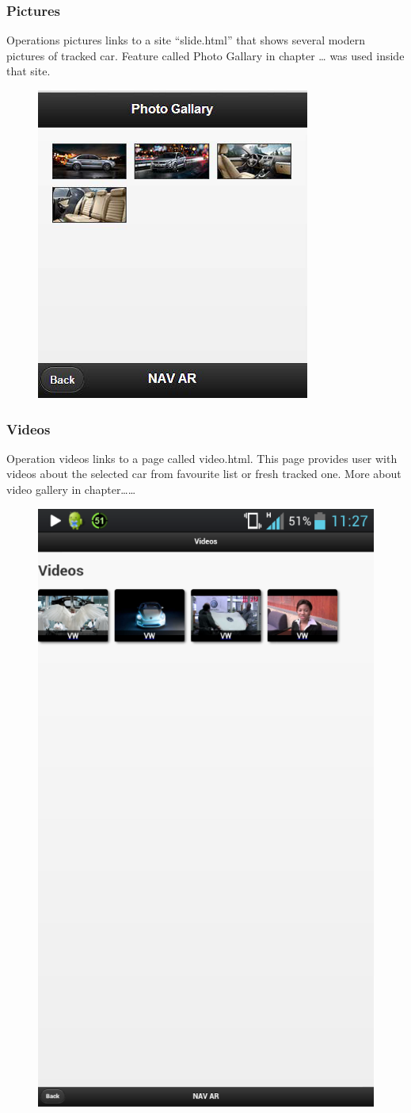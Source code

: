 \subsubsection{Pictures}
Operations pictures links to a site “slide.html” that shows several modern pictures of tracked car. Feature called Photo Gallary in chapter … was used inside that site.
\\
\begin{figure}[h]
\centering
\includegraphics[width=0.5\linewidth]{graphics/chapter4/7}
\caption{}
\label{fig:8}
\end{figure}
\newpage

\subsubsection{Videos}
Operation videos links to a page called video.html. This page provides user with videos about the selected car from favourite list or fresh tracked one. More about video gallery in chapter……
\\
\begin{figure}[h]
\centering
\includegraphics[width=0.5\linewidth]{graphics/chapter4/8}
\caption{}
\label{fig:9}
\end{figure}
\newpage

